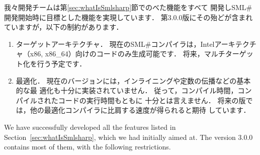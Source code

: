 \documentclass{jbook}
\newif\ifjp
\newcommand{\smlsharp}{SML\#}
\newcommand{\version}{3.0.0}
\begin{document}
\ifjp%
	我々開発チームは第\ref{sec:whatIsSmlsharp}節でのべた機能をすべて
開発し\smlsharp{}開発開始時に目標とした機能を実現しています．
	第\version{}版にその殆どが含まれていますが，以下の制約があります．
\begin{enumerate}
\item ターゲットアーキテクチャ．
	現在の\smlsharp{}コンパイラは，Intelアーキテクチャ（x86, x86\_64）向けのコードのみ生成可能です．
	将来，マルチターゲット化を行う予定です．

\item 最適化．
	現在のバージョンには，インライニングや定数の伝播などの基本的な最
適化も十分に実装されていません．
	従って，コンパイル時間，コンパイルされたコードの実行時間もともに
十分とは言えません．
	将来の版では，他の最適化コンパイラに比肩する速度が得られると期待
しています．
\end{enumerate}
\else%
	We have successfully developed all the features listed in
Section~\ref{sec:whatIsSmlsharp}, which we had initially aimed at.
	The version \version{} contains most of them, with the following 
restrictions.
\end{document}
